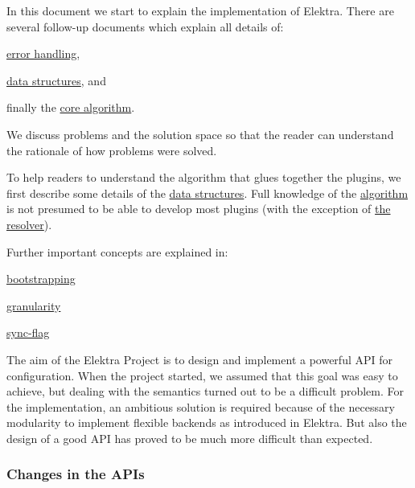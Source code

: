 In this document we start to explain the implementation of Elektra. There are several follow-\/up documents which explain all details of\+:


\begin{DoxyItemize}
\item \hyperlink{md_doc_help_elektra-error-handling_doc_help_elektra-error-handling_md}{error handling},
\item \hyperlink{md_doc_help_elektra-data-structures_doc_help_elektra-data-structures_md}{data structures}, and
\item finally the \hyperlink{md_doc_help_elektra-algorithm_doc_help_elektra-algorithm_md}{core algorithm}.
\end{DoxyItemize}

We discuss problems and the solution space so that the reader can understand the rationale of how problems were solved.

To help readers to understand the algorithm that glues together the plugins, we first describe some details of the \hyperlink{md_doc_help_elektra-data-structures_doc_help_elektra-data-structures_md}{data structures}. Full knowledge of the \hyperlink{md_doc_help_elektra-algorithm_doc_help_elektra-algorithm_md}{algorithm} is not presumed to be able to develop most plugins (with the exception of \hyperlink{md_src_plugins_resolver_README_src_plugins_resolver_README_md}{the resolver}).

Further important concepts are explained in\+:


\begin{DoxyItemize}
\item \hyperlink{doc_help_elektra-bootstrapping_md}{bootstrapping}
\item \hyperlink{doc_help_elektra-granularity_md}{granularity}
\item \hyperlink{doc_help_elektra-sync-flag_md}{sync-\/flag}
\end{DoxyItemize}

The aim of the Elektra Project is to design and implement a powerful A\+P\+I for configuration. When the project started, we assumed that this goal was easy to achieve, but dealing with the semantics turned out to be a difficult problem. For the implementation, an ambitious solution is required because of the necessary modularity to implement flexible backends as introduced in Elektra. But also the design of a good A\+P\+I has proved to be much more difficult than expected.

\subsubsection*{Changes in the A\+P\+Is}

